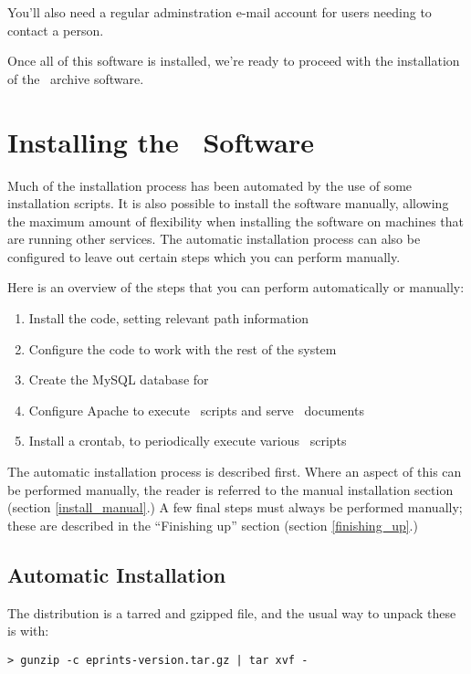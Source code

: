 You'll also need a regular adminstration e-mail account for users needing to contact a person.

Once all of this software is installed, we're ready to proceed with the installation of the \eprints\ archive software.


\section{Installing the \eprints\ Software}
\label{install_software}

Much of the installation process has been automated by the use of some installation scripts.  It is also possible to install the software manually, allowing the maximum amount of flexibility when installing the software on machines that are running other services.  The automatic installation process can also be configured to leave out certain steps which you can perform manually.

Here is an overview of the steps that you can perform automatically or manually:

\begin{enumerate}
\item Install the code, setting relevant path information
\item Configure the code to work with the rest of the system
\item Create the MySQL database for \eprints\
\item Configure Apache to execute \eprints\ scripts and serve \eprints\ documents
\item Install a crontab, to periodically execute various \eprints\ scripts
\end{enumerate}

The automatic installation process is described first.  Where an aspect of this can be performed manually, the reader is referred to the manual installation section (section \ref{install_manual}.)  A few final steps must always be performed manually; these are described in the ``Finishing up'' section (section \ref{finishing_up}.)


\subsection{Automatic Installation}

The distribution is a tarred and gzipped file, and the usual way to unpack these is with:

\begin{verbatim}
> gunzip -c eprints-version.tar.gz | tar xvf -
\end{verbatim}

